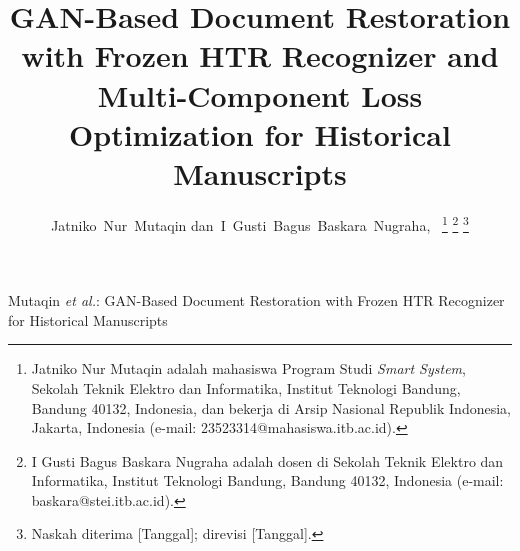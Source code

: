 \documentclass[journal]{IEEEtran}
\begin{document}
% 
\title{GAN-Based Document Restoration with Frozen HTR Recognizer and Multi-Component Loss Optimization for Historical Manuscripts}
% 
\author{Jatniko~Nur~Mutaqin
        dan~I~Gusti~Bagus~Baskara~Nugraha,~%
\thanks{Jatniko Nur Mutaqin adalah mahasiswa Program Studi \textit{Smart System}, Sekolah Teknik Elektro dan Informatika, Institut Teknologi Bandung, Bandung 40132, Indonesia, dan bekerja di Arsip Nasional Republik Indonesia, Jakarta, Indonesia (e-mail: 23523314@mahasiswa.itb.ac.id).}%
\thanks{I Gusti Bagus Baskara Nugraha adalah dosen di Sekolah Teknik Elektro dan Informatika, Institut Teknologi Bandung, Bandung 40132, Indonesia (e-mail: baskara@stei.itb.ac.id).}%
\thanks{Naskah diterima [Tanggal]; direvisi [Tanggal].}}

% 
{Mutaqin \MakeLowercase{\textit{et al.}}: GAN-Based Document Restoration with Frozen HTR Recognizer for Historical Manuscripts}

\maketitle
\end{document}

